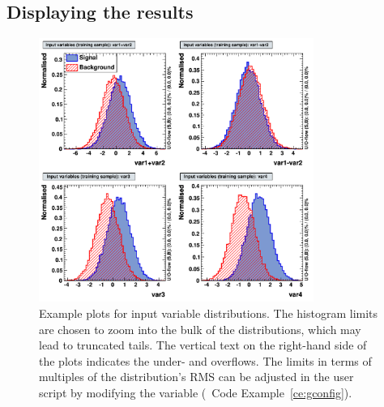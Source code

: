 \subsection{Displaying the results}
\label{sec:displayingResults}

\begin{figure}[!t]
\begin{center}
  \includegraphics[width=0.8\textwidth]{plots/variables_c1}
\end{center}
  \vspace{-0.5cm}
\caption[.]{Example plots for input variable distributions. The histogram
            limits are chosen to zoom into the bulk of the distributions, which
            may lead to truncated tails. The vertical text on the
            right-hand side of the plots indicates the under- and overflows.
            The limits in terms of multiples of the distribution's RMS can
            be adjusted in the user script by modifying the variable
             (\cf\
            Code Example~\ref{ce:gconfig}). }
\label{fig:usingtmva:variables}
\end{figure}

